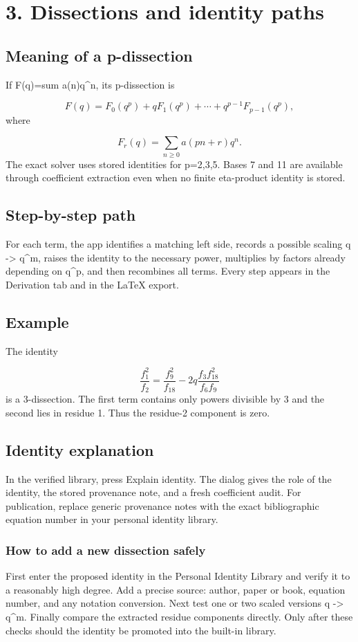 \documentclass[11pt]{article}
\begin{document}
\newpage
\section{3. Dissections and identity paths}
\subsection*{Meaning of a p-dissection}
If F(q)=sum a(n)q\textasciicircum{}n, its p-dissection is

\[
F(q)=F_0(q^p)+qF_1(q^p)+\cdots+q^{p-1}F_{p-1}(q^p),
\]
where

\[
F_r(q)=\sum_{n\ge0}a(pn+r)q^n.
\]
The exact solver uses stored identities for p=2,3,5. Bases 7 and 11 are available through coefficient extraction even when no finite eta-product identity is stored.

\subsection*{Step-by-step path}
For each term, the app identifies a matching left side, records a possible scaling q -> q\textasciicircum{}m, raises the identity to the necessary power, multiplies by factors already depending on q\textasciicircum{}p, and then recombines all terms. Every step appears in the Derivation tab and in the LaTeX export.

\subsection*{Example}
The identity

\[
\frac{f_1^2}{f_2}=\frac{f_9^2}{f_{18}}-2q\frac{f_3f_{18}^2}{f_6f_9}
\]
is a 3-dissection. The first term contains only powers divisible by 3 and the second lies in residue 1. Thus the residue-2 component is zero.

\subsection*{Identity explanation}
In the verified library, press Explain identity. The dialog gives the role of the identity, the stored provenance note, and a fresh coefficient audit. For publication, replace generic provenance notes with the exact bibliographic equation number in your personal identity library.

\subsubsection*{How to add a new dissection safely}
First enter the proposed identity in the Personal Identity Library and verify it to a reasonably high degree. Add a precise source: author, paper or book, equation number, and any notation conversion. Next test one or two scaled versions q -> q\textasciicircum{}m. Finally compare the extracted residue components directly. Only after these checks should the identity be promoted into the built-in library.
\end{document}

